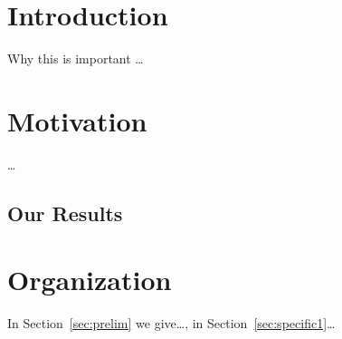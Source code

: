 \documentclass[../techreport.tex]{subfiles}
\begin{document}
\section{Introduction}
\label{sec:intro}
Why this is important \ldots 
\lipsum[4]
\section{Motivation}
\lipsum[5]
\ldots
\subsection{Our Results}
\lipsum[6]

\section{Organization}
In Section~\ref{sec:prelim} we give\ldots, in Section~\ref{sec:specific1}\ldots

\lipsum[7]
\end{document}
